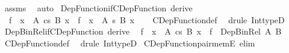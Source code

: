 \begin{isabellebody}
\ assms\ \isamarkupfalse%
\ auto%
\endisatagproof
{\isafoldproof}%
%
\isadelimproof
\isanewline
%
\endisadelimproof
\isanewline
{}\isamarkupfalse%
\ Dep{\isacharunderscore}{\kern0pt}Function{\isacharunderscore}{\kern0pt}if{\isacharunderscore}{\kern0pt}CDep{\isacharunderscore}{\kern0pt}Function\ {\isacharbrackleft}{\kern0pt}derive{\isacharbrackright}{\kern0pt}{\isacharcolon}{\kern0pt}\isanewline
\ \ {\isachardoublequoteopen}f\ {\isacharcolon}{\kern0pt}\ {\isacharparenleft}{\kern0pt}x\ {\isacharcolon}{\kern0pt}\ A{\isacharparenright}{\kern0pt}\ {\isasymrightarrow}cs\ B\ x\ {\isasymLongrightarrow}\ f\ {\isacharcolon}{\kern0pt}\ {\isacharparenleft}{\kern0pt}x\ {\isacharcolon}{\kern0pt}\ A{\isacharparenright}{\kern0pt}\ {\isasymrightarrow}s\ B\ x{\isachardoublequoteclose}\isanewline
%
\isadelimproof
\ \ %
\endisadelimproof
%
\isatagproof
{}\isamarkupfalse%
\ CDep{\isacharunderscore}{\kern0pt}Function{\isacharunderscore}{\kern0pt}def\ \isamarkupfalse%
\ {\isacharparenleft}{\kern0pt}drule\ Int{\isacharunderscore}{\kern0pt}typeD{}{\isacharparenright}{\kern0pt}%
\endisatagproof
{\isafoldproof}%
%
\isadelimproof
\isanewline
%
\endisadelimproof
\isanewline
{}\isamarkupfalse%
\ Dep{\isacharunderscore}{\kern0pt}Bin{\isacharunderscore}{\kern0pt}Rel{\isacharunderscore}{\kern0pt}if{\isacharunderscore}{\kern0pt}CDep{\isacharunderscore}{\kern0pt}Function\ {\isacharbrackleft}{\kern0pt}derive{\isacharbrackright}{\kern0pt}{\isacharcolon}{\kern0pt}\isanewline
\ \ {\isachardoublequoteopen}f\ {\isacharcolon}{\kern0pt}\ {\isacharparenleft}{\kern0pt}x\ {\isacharcolon}{\kern0pt}\ A{\isacharparenright}{\kern0pt}\ {\isasymrightarrow}cs\ {\isacharparenleft}{\kern0pt}B\ x{\isacharparenright}{\kern0pt}\ {\isasymLongrightarrow}\ f\ {\isacharcolon}{\kern0pt}\ Dep{\isacharunderscore}{\kern0pt}Bin{\isacharunderscore}{\kern0pt}Rel\ A\ B{\isachardoublequoteclose}\isanewline
%
\isadelimproof
\ \ %
\endisadelimproof
%
\isatagproof
{}\isamarkupfalse%
\ CDep{\isacharunderscore}{\kern0pt}Function{\isacharunderscore}{\kern0pt}def\ \isamarkupfalse%
\ {\isacharparenleft}{\kern0pt}drule\ Int{\isacharunderscore}{\kern0pt}typeD{}{\isacharparenright}{\kern0pt}%
\endisatagproof
{\isafoldproof}%
%
\isadelimproof
\isanewline
%
\endisadelimproof
\isanewline
{}\isamarkupfalse%
\ CDep{\isacharunderscore}{\kern0pt}Function{\isacharunderscore}{\kern0pt}pair{\isacharunderscore}{\kern0pt}memE\ {\isacharbrackleft}{\kern0pt}elim{\isacharbrackright}{\kern0pt}{\isacharcolon}{\kern0pt}\isanewline

\end{isabellebody}

